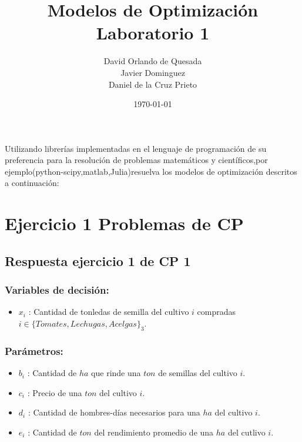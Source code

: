 \documentclass[]{article}
\begin{document}
\title{\bf  Modelos de Optimizaci\'on Laboratorio 1}          
\author{David Orlando de Quesada \\ Javier Dominguez \\ Daniel de la Cruz Prieto  }                        
\date{\today} 

\maketitle 

Utilizando librer\'ias implementadas en el lenguaje de programaci\'on de su preferencia para la resoluci\'on de problemas matem\'aticos y cient\'ificos,por ejemplo(python-scipy,matlab,Julia)resuelva los modelos de optimizaci\'on descritos a continuaci\'on:


\section*{Ejercicio 1 Problemas de CP} 

 \subsection*{Respuesta ejercicio 1 de CP 1} 
 
 \subsubsection*{Variables de decisi\'on:} 
 
 \begin{itemize}
 	\item $x_i$ : Cantidad de tonledas de semilla del cultivo $i$ compradas $i \in \{Tomates, Lechugas, Acelgas\}_3$.
 \end{itemize}
 
 
 
  \subsubsection*{Par\'ametros:} 
 
 \begin{itemize}
 	 \item $b_i$ : Cantidad de $ha$ que rinde una $ton$ de semillas del cultivo $i$.
 	
 	\item  $c_i$ : Precio de una $ton$ del cultivo $i$.
 	
 	\item  $d_i$ : Cantidad de hombres-d\'ias necesarios para una $ha$ del cultivo $i$.
 	
 	\item $e_i$ : Cantidad de $ton$ del rendimiento promedio de una $ha$ del cutlivo $i$.
 \end{itemize} 
   
\end{document}
